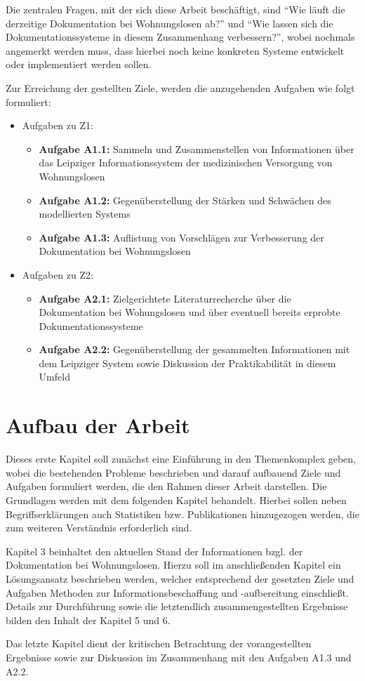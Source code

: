Die zentralen Fragen, mit der sich diese Arbeit beschäftigt, sind \enquote{Wie läuft die derzeitige Dokumentation bei Wohnungslosen ab?} und \enquote{Wie lassen sich die Dokumentationssysteme in diesem Zusammenhang verbessern?}, wobei nochmals angemerkt werden muss, dass hierbei noch keine konkreten Systeme entwickelt oder implementiert werden sollen.

Zur Erreichung der gestellten Ziele, werden die anzugehenden Aufgaben wie folgt formuliert:

\begin{itemize}
	\item Aufgaben zu Z1:
	\begin{itemize}
		\item \textbf{Aufgabe A1.1:} Sammeln und Zusammenstellen von Informationen über das Leipziger Informationssystem der medizinischen Versorgung von Wohnungslosen
		\item \textbf{Aufgabe A1.2:} Gegenüberstellung der Stärken und Schwächen des modellierten Systems
		\item \textbf{Aufgabe A1.3:} Auflistung von Vorschlägen zur Verbesserung der Dokumentation bei Wohnungslosen
	\end{itemize}
	\item Aufgaben zu Z2:
	\begin{itemize}
		\item \textbf{Aufgabe A2.1:} Zielgerichtete Literaturrecherche über die Dokumentation bei Wohungslosen und über eventuell bereits erprobte Dokumentationssysteme
		\item \textbf{Aufgabe A2.2:} Gegenüberstellung der gesammelten Informationen mit dem Leipziger System sowie Diskussion der Praktikabilität in diesem Umfeld
	\end{itemize}
\end{itemize}

\section{Aufbau der Arbeit}

Dieses erste Kapitel soll zunächst eine Einführung in den Themenkomplex geben, wobei die bestehenden Probleme beschrieben und darauf aufbauend Ziele und Aufgaben formuliert werden, die den Rahmen dieser Arbeit darstellen. Die Grundlagen werden mit dem folgenden Kapitel behandelt. Hierbei sollen neben Begriffserklärungen auch Statistiken bzw. Publikationen hinzugezogen werden, die zum weiteren Verständnis erforderlich sind.

Kapitel 3 beinhaltet den aktuellen Stand der Informationen bzgl. der Dokumentation bei Wohnungslosen. Hierzu soll im anschließenden Kapitel ein Lösungsansatz beschrieben werden, welcher entsprechend der gesetzten Ziele und Aufgaben Methoden zur Informationsbeschaffung und -aufbereitung einschließt. Details zur Durchführung sowie die letztendlich zusammengestellten Ergebnisse bilden den Inhalt der Kapitel 5 und 6.

Das letzte Kapitel dient der kritischen Betrachtung der vorangestellten Ergebnisse sowie zur Diskussion im Zusammenhang mit den Aufgaben A1.3 und A2.2.